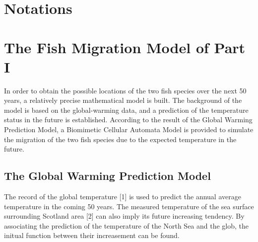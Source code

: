 \documentclass{mcmthesis}
\begin{document}





\section{Notations}


\newpage
\section{The Fish Migration Model of Part I}
In order to obtain the possible locations of the two fish species over the next 50 years, a relatively precise mathematical model is built. The background of the model is based on the global-warming data, and a prediction of the temperature status in the future is established. According to the result of the Global Warming Prediction Model, a Biomimetic Cellular Automata Model is provided to simulate the migration of the two fish species due to the expected temperature in the future.

\subsection{The Global Warming Prediction Model}
The record of the global temperature [1] is used to predict the annual average temperature in the coming 50 years. The measured temperature of the sea surface surrounding Scotland area [2] can also imply its future increasing tendency. By associating the prediction of the temperature of  the North Sea and the glob, the initual function between their increasement can be found. 
\end{document}
